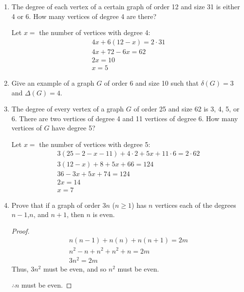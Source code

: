 \documentclass[letterpaper,12pt,fleqn]{article}
\renewcommand{\d}{\delta}
\newcommand{\D}{\Delta}
\begin{document}
\begin{enumerate}
\item The degree of each vertex of a certain graph of order 12 and size 31 is either 4 or 6.  How many vertices of
  degree 4 are there?

  Let \(x=\) the number of vertices with degree 4:
  \begin{gather*}
    4x+6(12-x)=2\cdot31 \\
    4x+72-6x=62 \\
    2x=10 \\
    x=5
  \end{gather*}

\item Give an example of a graph \(G\) of order 6 and size 10 such that \(\d(G)=3\) and \(\D(G)=4\).
  \begin{quote}
  \end{quote}

\item The degree of every vertex of a graph \(G\) of order 25 and size 62 is 3, 4, 5, or 6.  There are two vertices
  of degree 4 and 11 vertices of degree 6.  How many vertices of \(G\) have degree 5?

  Let \(x=\) the number of vertices with degree 5:
  \begin{gather*}
    3(25-2-x-11)+4\cdot2+5x+11\cdot6=2\cdot62 \\
    3(12-x)+8+5x+66=124 \\
    36-3x+5x+74=124 \\
    2x=14 \\
    x=7
  \end{gather*}

\item Prove that if a graph of order \(3n\) (\(n\ge1\)) has \(n\) vertices each of the degrees \(n-1\),\(n\), and
  \(n+1\), then \(n\) is even.

  \begin{proof}
    \begin{gather*}
      n(n-1)+n(n)+n(n+1)=2m \\
      n^2-n+n^2+n^2+n=2m \\
      3n^2=2m
    \end{gather*}
    Thus, \(3n^2\) must be even, and so \(n^2\) must be even.

    \(\therefore n\) must be even.
  \end{proof}
\end{enumerate}
\end{document}
